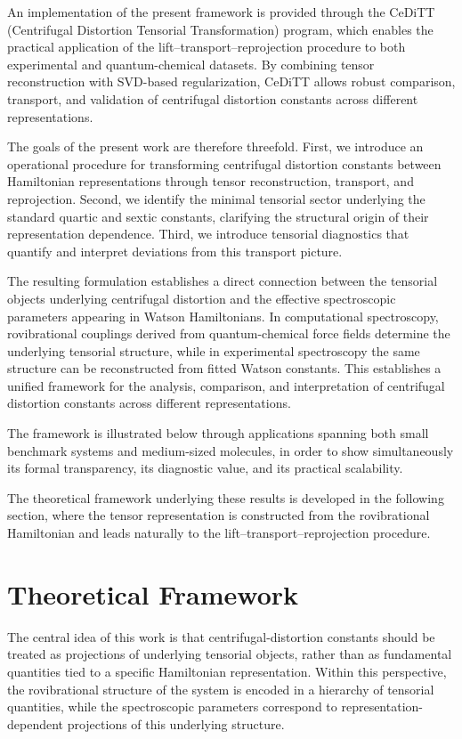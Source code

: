 \documentclass[aip,jcp,reprint,floatfix]{revtex4-2}
\begin{document}
An implementation of the present framework is provided through the
CeDiTT (Centrifugal Distortion Tensorial Transformation) program,
which enables the practical application of the
lift--transport--reprojection procedure to both experimental and
quantum-chemical datasets. By combining tensor reconstruction with SVD-based
regularization, CeDiTT allows robust comparison, transport, and
validation of centrifugal distortion constants across different
representations.

The goals of the present work are therefore threefold. First, we
introduce an operational procedure for transforming centrifugal
distortion constants between Hamiltonian representations through
tensor reconstruction, transport, and reprojection. Second, we identify
the minimal tensorial sector underlying the standard quartic and
sextic constants, clarifying the structural origin of their
representation dependence. Third, we introduce tensorial diagnostics
that quantify and interpret deviations from this transport picture.

The resulting formulation establishes a direct connection between the
tensorial objects underlying centrifugal distortion and the effective
spectroscopic parameters appearing in Watson Hamiltonians. In
computational spectroscopy, rovibrational couplings derived from
quantum-chemical force fields determine the underlying tensorial
structure, while in experimental spectroscopy the same structure can be
reconstructed from fitted Watson constants. This establishes a unified
framework for the analysis, comparison, and interpretation of
centrifugal distortion constants across different representations.

The framework is illustrated below through applications spanning both
small benchmark systems and medium-sized molecules, in order to show
simultaneously its formal transparency, its diagnostic value, and its
practical scalability.

The theoretical framework underlying these results is developed in the
following section, where the tensor representation is constructed from
the rovibrational Hamiltonian and leads naturally to the
lift--transport--reprojection procedure.


\section{Theoretical Framework}

The central idea of this work is that centrifugal-distortion constants
should be treated as projections of underlying tensorial objects,
rather than as fundamental quantities tied to a specific Hamiltonian
representation. Within this perspective, the rovibrational structure
of the system is encoded in a hierarchy of tensorial quantities, while
the spectroscopic parameters correspond to representation-dependent
projections of this underlying structure.
\end{document}
